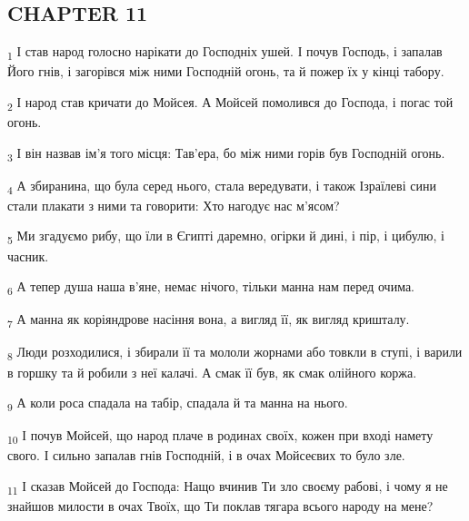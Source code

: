 \subsection{CHAPTER 11}
\begin{tcolorbox}
\textsubscript{1} І став народ голосно нарікати до Господніх ушей. І почув Господь, і запалав Його гнів, і загорівся між ними Господній огонь, та й пожер їх у кінці табору.
\end{tcolorbox}
\begin{tcolorbox}
\textsubscript{2} І народ став кричати до Мойсея. А Мойсей помолився до Господа, і погас той огонь.
\end{tcolorbox}
\begin{tcolorbox}
\textsubscript{3} І він назвав ім'я того місця: Тав'ера, бо між ними горів був Господній огонь.
\end{tcolorbox}
\begin{tcolorbox}
\textsubscript{4} А збиранина, що була серед нього, стала вередувати, і також Ізраїлеві сини стали плакати з ними та говорити: Хто нагодує нас м'ясом?
\end{tcolorbox}
\begin{tcolorbox}
\textsubscript{5} Ми згадуємо рибу, що їли в Єгипті даремно, огірки й дині, і пір, і цибулю, і часник.
\end{tcolorbox}
\begin{tcolorbox}
\textsubscript{6} А тепер душа наша в'яне, немає нічого, тільки манна нам перед очима.
\end{tcolorbox}
\begin{tcolorbox}
\textsubscript{7} А манна як коріяндрове насіння вона, а вигляд її, як вигляд кришталу.
\end{tcolorbox}
\begin{tcolorbox}
\textsubscript{8} Люди розходилися, і збирали її та мололи жорнами або товкли в ступі, і варили в горшку та й робили з неї калачі. А смак її був, як смак олійного коржа.
\end{tcolorbox}
\begin{tcolorbox}
\textsubscript{9} А коли роса спадала на табір, спадала й та манна на нього.
\end{tcolorbox}
\begin{tcolorbox}
\textsubscript{10} І почув Мойсей, що народ плаче в родинах своїх, кожен при вході намету свого. І сильно запалав гнів Господній, і в очах Мойсеєвих то було зле.
\end{tcolorbox}
\begin{tcolorbox}
\textsubscript{11} І сказав Мойсей до Господа: Нащо вчинив Ти зло своєму рабові, і чому я не знайшов милости в очах Твоїх, що Ти поклав тягара всього народу на мене?
\end{tcolorbox}
